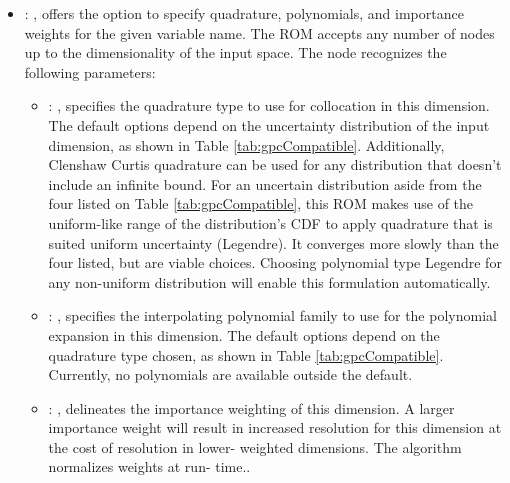 \begin{itemize}
    \item {}: , 
      offers the option to specify quadrature, polynomials, and importance weights for the given
      variable name.  The ROM accepts any number of  nodes up to the
      dimensionality of the input space.
      The  node recognizes the following parameters:
        \begin{itemize}
          \item {}: , 
            specifies the quadrature type to use for collocation in this dimension.  The default
            options                   depend on the uncertainty distribution of the input dimension,
            as shown in Table                   \ref{tab:gpcCompatible}. Additionally, Clenshaw
            Curtis quadrature can be used for any                   distribution that doesn't
            include an infinite bound.                                      \nb For an uncertain distribution aside from
            the four listed on Table                   \ref{tab:gpcCompatible}, this ROM
            makes use of the uniform-like range of the distribution's CDF to apply quadrature that
            is                   suited uniform uncertainty (Legendre).  It converges more slowly
            than the four listed, but are                   viable choices.  Choosing polynomial
            type Legendre for any non-uniform distribution will                   enable this
            formulation automatically.
          \item {}: , 
            specifies the interpolating polynomial family to use for the polynomial expansion in
            this                   dimension.  The default options depend on the quadrature type
            chosen, as shown in Table                   \ref{tab:gpcCompatible}.  Currently, no
            polynomials are available outside the                   default. 
          \item {}: , 
            delineates the importance weighting of this dimension.  A larger importance weight will
            result in increased resolution for this dimension at the cost of resolution in lower-
            weighted                   dimensions.  The algorithm normalizes weights at run-
            time..
      \end{itemize}
  \end{itemize}

